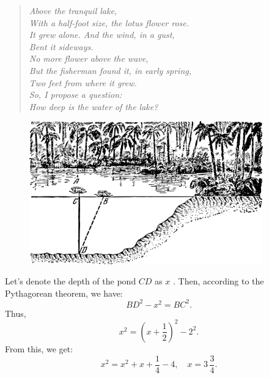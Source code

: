 \ques 
\begin{quote}
\emph{
Above the tranquil lake, \\
With a half-foot size, the lotus flower rose. \\
It grew alone. And the wind, in a gust, \\
Bent it sideways. \\
No more flower above the wave, \\
But the fisherman found it, in early spring, \\
Two feet from where it grew.\\
So, I propose a question: \\
How deep is the water of the lake?}\\[-15pt]
\end{quote}

\begin{figure}[h!]
\centering
\includegraphics[width=0.9\textwidth]{figures/ch-02/fig-053.pdf}
\end{figure}



\ans Let's denote the depth of the pond $CD$ as \( x \) . Then, according to the Pythagorean theorem, we have:
\begin{equation*}%
BD^{2} - x^{2} = BC^{2}.
\end{equation*}
Thus, 
\begin{equation*}%
x^{2} = \left( x + \frac{1}{2} \right)^{2} - 2^{2}.
\end{equation*}
From this, we get:
\begin{equation*}%
x^{2} = x^{2}  + x + \frac{1}{4} - 4 , \quad x = 3\,\frac{3}{4}.
\end{equation*}

